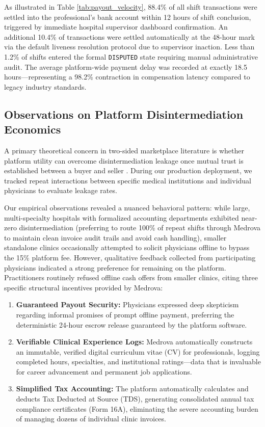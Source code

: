 \documentclass[conference]{IEEEtran}
\begin{document}
As illustrated in Table \ref{tab:payout_velocity}, 88.4\% of all shift transactions were settled into the professional's bank account within 12 hours of shift conclusion, triggered by immediate hospital supervisor dashboard confirmation. An additional 10.4\% of transactions were settled automatically at the 48-hour mark via the default liveness resolution protocol due to supervisor inaction. Less than 1.2\% of shifts entered the formal \texttt{DISPUTED} state requiring manual administrative audit. The average platform-wide payment delay was recorded at exactly 18.5 hours---representing a 98.2\% contraction in compensation latency compared to legacy industry standards.

\subsection{Observations on Platform Disintermediation Economics}
A primary theoretical concern in two-sided marketplace literature is whether platform utility can overcome disintermediation leakage once mutual trust is established between a buyer and seller \cite{edelman2016disintermediation, gu2021trust}. During our production deployment, we tracked repeat interactions between specific medical institutions and individual physicians to evaluate leakage rates.

Our empirical observations revealed a nuanced behavioral pattern: while large, multi-specialty hospitals with formalized accounting departments exhibited near-zero disintermediation (preferring to route 100\% of repeat shifts through Medrova to maintain clean invoice audit trails and avoid cash handling), smaller standalone clinics occasionally attempted to solicit physicians offline to bypass the 15\% platform fee. However, qualitative feedback collected from participating physicians indicated a strong preference for remaining on the platform. Practitioners routinely refused offline cash offers from smaller clinics, citing three specific structural incentives provided by Medrova:
\begin{enumerate}
    \item \textbf{Guaranteed Payout Security:} Physicians expressed deep skepticism regarding informal promises of prompt offline payment, preferring the deterministic 24-hour escrow release guaranteed by the platform software.
    \item \textbf{Verifiable Clinical Experience Logs:} Medrova automatically constructs an immutable, verified digital curriculum vitae (CV) for professionals, logging completed hours, specialties, and institutional ratings---data that is invaluable for career advancement and permanent job applications.
    \item \textbf{Simplified Tax Accounting:} The platform automatically calculates and deducts Tax Deducted at Source (TDS), generating consolidated annual tax compliance certificates (Form 16A), eliminating the severe accounting burden of managing dozens of individual clinic invoices.
\end{enumerate}
\end{document}
